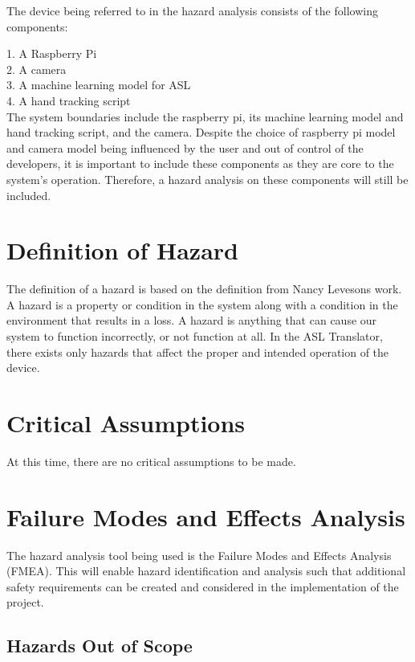 \documentclass{article}
\begin{document}
The device being referred to in the hazard analysis consists of the following components:

1. A Raspberry Pi\\
2. A camera\\
3. A machine learning model for ASL\\
4. A hand tracking script\\

The system boundaries include the raspberry pi, its machine learning model and hand tracking script, and the camera. Despite the choice of raspberry pi model and camera model being influenced by the user and out of control of the developers, it is important to include these components as they are core to the system’s operation. Therefore, a hazard analysis on these components will still be included.


\section{Definition of Hazard}

The definition of a hazard is based on the definition from Nancy Leveson\textquotesingle s work. A hazard is a property or condition in the system along with a condition in the
environment that results in a loss. A hazard is anything that can cause our system to function incorrectly, or not function at all. In the ASL Translator, there
exists only hazards that affect the proper and intended operation of the device.\\


\section{Critical Assumptions}
At this time, there are no critical assumptions to be made.

\section{Failure Modes and Effects Analysis}

The hazard analysis tool being used is the Failure Modes and Effects Analysis (FMEA). This will enable hazard identification and analysis such that additional safety requirements can 
be created and considered in the implementation of the project.\\

\subsection{Hazards Out of Scope}
\end{document}
